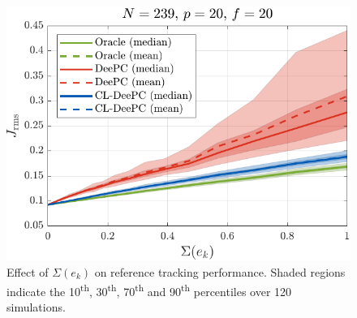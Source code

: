 \begin{figure}[t!]
\begin{center}
\includegraphics[width=\columnwidth]{results/figures/Varying_Re_0.0001-1-50_Nbar_239_p_20_f_20_Ru_1_Rdu_0_Q_100_R_0_dR_10.pdf}    %
\caption{Effect of $\Sigma(e_k)$ on reference tracking performance. Shaded regions indicate the 10\textsuperscript{th}, 30\textsuperscript{th}, 70\textsuperscript{th} and 90\textsuperscript{th} percentiles over 120 simulations.}  %
\label{fig:varying_Re}                                 %
\end{center}                                 %
\end{figure}

